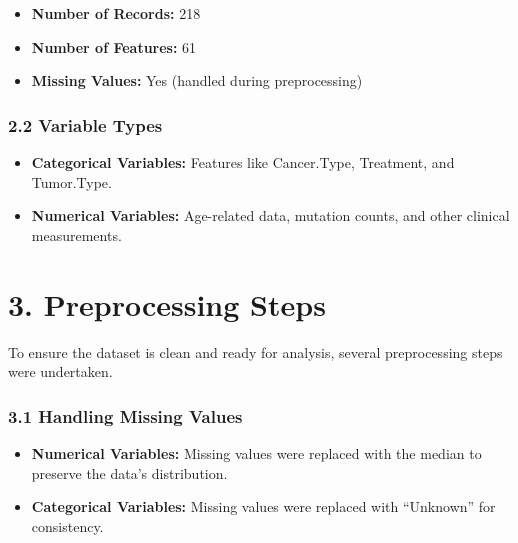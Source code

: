 \documentclass[
]{article}
\providecommand{\tightlist}{%
  \setlength{\itemsep}{0pt}\setlength{\parskip}{0pt}}
\begin{document}
\begin{itemize}
\tightlist
\item
  \textbf{Number of Records:} 218
\item
  \textbf{Number of Features:} 61
\item
  \textbf{Missing Values:} Yes (handled during preprocessing)
\end{itemize}

\subsubsection{\texorpdfstring{2.2 \textbf{Variable
Types}}{2.2 Variable Types}}\label{variable-types}

\begin{itemize}
\tightlist
\item
  \textbf{Categorical Variables:} Features like Cancer.Type, Treatment,
  and Tumor.Type.
\item
  \textbf{Numerical Variables:} Age-related data, mutation counts, and
  other clinical measurements.
\end{itemize}

\section{\texorpdfstring{\textbf{3. Preprocessing
Steps}}{3. Preprocessing Steps}}\label{preprocessing-steps}

To ensure the dataset is clean and ready for analysis, several
preprocessing steps were undertaken.

\subsubsection{\texorpdfstring{\textbf{3.1 Handling Missing
Values}}{3.1 Handling Missing Values}}\label{handling-missing-values}

\begin{itemize}
\item
  \textbf{Numerical Variables:} Missing values were replaced with the
  median to preserve the data's distribution.
\item
  \textbf{Categorical Variables:} Missing values were replaced with
  ``Unknown'' for consistency.
\end{itemize}
\end{document}
